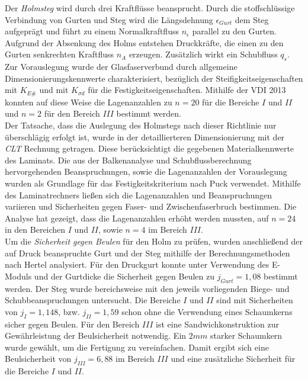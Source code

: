 \noindent Der \textit{Holmsteg} wird durch drei Kraftflüsse beansprucht. Durch die stoffschlüssige Verbindung von Gurten und Steg wird die Längsdehnung $ \epsilon_{Gurt} $ dem Steg aufgeprägt und führt zu einem Normalkraftfluss $ n_{\epsilon} $ parallel zu den Gurten. Aufgrund der Absenkung des Holms entstehen Druckkräfte, die einen zu den Gurten senkrechten Kraftfluss $ n_{A} $ erzeugen. Zusätzlich wirkt ein Schubfluss $ q_{s} $. Zur Vorauslegung wurde der Glasfaserverbund durch allgemeine Dimensionierungskennwerte charakterisiert, bezüglich der Steifigkeitseigenschaften mit $ K_{E\#} $ und mit $ K_{\sigma d} $ für die Festigkeitseigenschaften. Mithilfe der VDI 2013 konnten auf diese Weise die Lagenanzahlen zu $ n=20 $ für die Bereiche $ I $ und $ II $ und $ n=2 $ für den Bereich $ III $ bestimmt werden.\\

\noindent Der Tatsache, dass die Auslegung des Holmstegs nach dieser Richtlinie nur überschlägig erfolgt ist, wurde in der detaillierteren Dimensionierung mit der \textit{CLT} Rechnung getragen. Diese berücksichtigt die gegebenen Materialkennwerte des Laminats. Die aus der Balkenanalyse und Schubflussberechnung hervorgehenden Beanspruchungen, sowie die Lagenanzahlen der Vorauslegung wurden als Grundlage für das Festigkeitskriterium nach Puck verwendet. Mithilfe des Laminatrechners ließen sich die Lagenanzahlen und Beanspruchungen variieren und Sicherheiten gegen Faser- und Zwischenfaserbruch bestimmen. Die Analyse hat gezeigt, dass die Lagenanzahlen erhöht werden mussten, auf $ n=24 $ in den Bereichen $I$ und $II$, sowie $ n=4 $ im Bereich $ III $.\\

\noindent Um die \textit{Sicherheit gegen Beulen} für den Holm zu prüfen, wurden anschließend der auf Druck beanspruchte Gurt und der Steg mithilfe der Berechnungsmethoden nach Hertel analysiert. Für den Druckgurt konnte unter Verwendung des E-Moduls und der Gurtdicke die Sicherheit gegen Beulen zu $ j_{Gurt}=1,08 $ bestimmt werden. Der Steg wurde bereichsweise mit den jeweils vorliegenden Biege- und Schubbeanspruchungen untersucht. Die Bereiche $ I $ und $ II $ sind mit Sicherheiten von $ j_{I}=1,148 $, bzw. $ j_{II}=1,59 $ schon ohne die Verwendung eines Schaumkerns sicher gegen Beulen. Für den Bereich $ III $ ist eine Sandwichkonstruktion zur Gewährleistung der Beulsicherheit notwendig. Ein $ 2mm $ starker Schaumkern wurde gewählt, um die Fertigung zu vereinfachen. Damit ergibt sich eine Beulsicherheit von $ j_{III}=6,88 $ im Bereich $ III $ und eine zusätzliche Sicherheit für die Bereiche $ I $ und $ II $.\\

